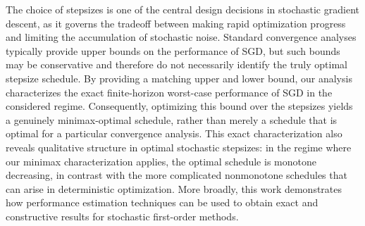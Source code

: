 \documentclass[11pt]{article}
\begin{document}
The choice of stepsizes is one of the central design decisions in stochastic gradient descent, as it governs the tradeoff between making rapid optimization progress and limiting the accumulation of stochastic noise. Standard convergence analyses typically provide upper bounds on the performance of SGD, but such bounds may be conservative and therefore do not necessarily identify the truly optimal stepsize schedule.
By providing a matching upper and lower bound, our analysis characterizes the exact finite-horizon worst-case performance of SGD in the considered regime. Consequently, optimizing this bound over the stepsizes yields a genuinely minimax-optimal schedule, rather than merely a schedule that is optimal for a particular convergence analysis. This exact characterization also reveals qualitative structure in optimal stochastic stepsizes: in the regime where our minimax characterization applies, the optimal schedule is monotone decreasing, in contrast with the more complicated nonmonotone schedules that can arise in deterministic optimization. More broadly, this work demonstrates how performance estimation techniques can be used to obtain exact and constructive results for stochastic first-order methods.




\end{document}
